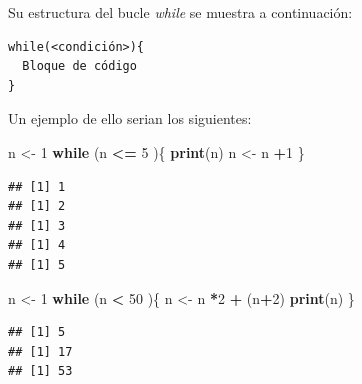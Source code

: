 \documentclass[11pt,]{article}
\newenvironment{Shaded}{\begin{snugshade}}{\end{snugshade}}
\newcommand{\ControlFlowTok}[1]{\textcolor[rgb]{0.13,0.29,0.53}{\textbf{#1}}}
\newcommand{\DecValTok}[1]{\textcolor[rgb]{0.00,0.00,0.81}{#1}}
\newcommand{\KeywordTok}[1]{\textcolor[rgb]{0.13,0.29,0.53}{\textbf{#1}}}
\newcommand{\NormalTok}[1]{#1}
\newcommand{\OperatorTok}[1]{\textcolor[rgb]{0.81,0.36,0.00}{\textbf{#1}}}
\newcommand{\StringTok}[1]{\textcolor[rgb]{0.31,0.60,0.02}{#1}}
\begin{document}
Su estructura del bucle \emph{while} se muestra a continuación:

\begin{verbatim}
while(<condición>){
  Bloque de código
}
\end{verbatim}

Un ejemplo de ello serian los siguientes:

\begin{Shaded}
\begin{Highlighting}[]
\NormalTok{n <-}\StringTok{ }\DecValTok{1}
\ControlFlowTok{while}\NormalTok{ (n }\OperatorTok{<=}\StringTok{ }\DecValTok{5}\NormalTok{ )\{}
  \KeywordTok{print}\NormalTok{(n)}
\NormalTok{  n <-}\StringTok{ }\NormalTok{n }\OperatorTok{+}\DecValTok{1}
\NormalTok{\}}
\end{Highlighting}
\end{Shaded}

\begin{verbatim}
## [1] 1
## [1] 2
## [1] 3
## [1] 4
## [1] 5
\end{verbatim}

\begin{Shaded}
\begin{Highlighting}[]
\NormalTok{n <-}\StringTok{ }\DecValTok{1}
\ControlFlowTok{while}\NormalTok{ (n }\OperatorTok{<}\StringTok{ }\DecValTok{50}\NormalTok{ )\{}
\NormalTok{  n <-}\StringTok{ }\NormalTok{n }\OperatorTok{*}\DecValTok{2} \OperatorTok{+}\StringTok{ }\NormalTok{(n}\OperatorTok{+}\DecValTok{2}\NormalTok{)}
  \KeywordTok{print}\NormalTok{(n)}
\NormalTok{\}}
\end{Highlighting}
\end{Shaded}

\begin{verbatim}
## [1] 5
## [1] 17
## [1] 53
\end{verbatim}

\newpage
\singlespacing 
\end{document}
